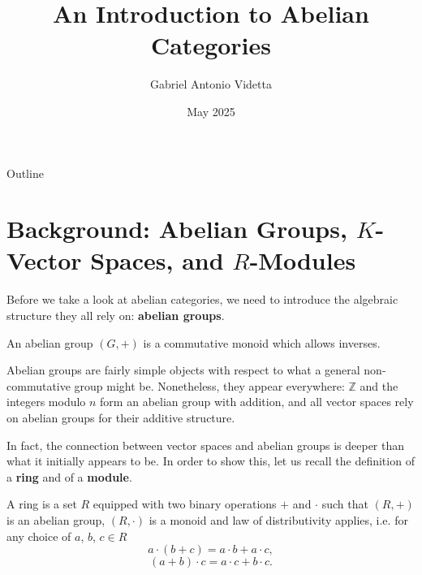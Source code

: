\documentclass{beamer}
\title{An Introduction to Abelian Categories}
\author{Gabriel Antonio Videtta\texorpdfstring{\vspace*{-13pt}}{}}
\date{May 2025}
\newcommand{\ZZ}{\mathbb{Z}}
\begin{document}
\begin{frame}
    \titlepage
\end{frame}


\begin{frame}{Outline}
    \tableofcontents
\end{frame}



\section{Background: Abelian Groups, \texorpdfstring{$K$}{K}-Vector Spaces, and \texorpdfstring{$R$}{R}-Modules}

\begin{frame}
    Before we take a look at abelian categories, we
    need to introduce the algebraic structure they
    all rely on: \textbf{abelian groups}. \medskip

    \begin{definition}
        An abelian group $(G, +)$ is a commutative monoid
        which allows inverses.
    \end{definition}

    Abelian groups are fairly simple objects with respect to what
    a general non-commutative group might be. Nonetheless, they
    appear everywhere: $\ZZ$ and the integers modulo $n$ form
    an abelian group with addition, and all vector spaces rely on
    abelian groups for their additive structure.
\end{frame}

\begin{frame}
    In fact, the connection between vector spaces and abelian groups is
    deeper than what it initially appears to be. In order to show this,
    let us recall the definition of a \textbf{ring} and of a \textbf{module}.

    \begin{definition}[Ring]
        A ring is a set $R$ equipped with two binary operations $+$ and $\cdot$
        such that $(R, +)$ is an abelian
        group, $(R, \cdot)$ is a monoid and law of distributivity applies, i.e.
        for any choice of $a$, $b$, $c \in R$
        \[
            a \cdot (b + c) = a \cdot b + a \cdot c,
        \]
        \[
            (a + b) \cdot c = a \cdot c + b \cdot c.
        \]
    \end{definition}
\end{frame}
\end{document}
